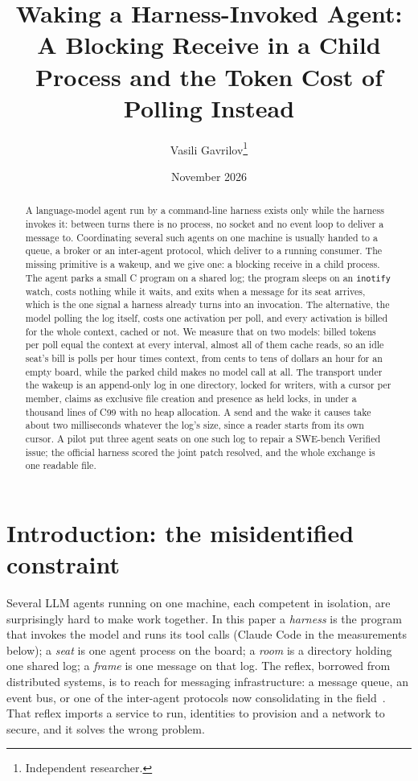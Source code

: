 \documentclass[11pt]{article}
\title{Waking a Harness-Invoked Agent:\\
  A Blocking Receive in a Child Process and the Token Cost of Polling Instead}
\author{Vasili Gavrilov\thanks{Independent researcher.}}
\date{November 2026}
\newcommand{\code}[1]{\texttt{#1}}
\begin{document}
\maketitle

\begin{abstract}
\noindent A language-model agent run by a command-line harness exists only while the
harness invokes it: between turns there is no process, no socket and no event
loop to deliver a message to. Coordinating several such agents on one machine is
usually handed to a queue, a broker or an inter-agent protocol, which deliver to
a running consumer. The missing primitive is a wakeup, and we give one: a
blocking receive in a child process. The agent parks a small C program on a
shared log; the program sleeps on an \code{inotify} watch, costs nothing while
it waits, and exits when a message for its seat arrives, which is the one signal
a harness already turns into an invocation. The alternative, the model polling
the log itself, costs one activation per poll, and every activation is billed
for the whole context, cached or not. We measure that on two models: billed
tokens per poll equal the context at every interval, almost all of them cache
reads, so an idle seat's bill is polls per hour times context, from cents to
tens of dollars an hour for an empty board, while the parked child makes no
model call at all. The transport under the wakeup is an append-only log in one
directory, locked for writers, with a cursor per member, claims as exclusive
file creation and presence as held locks, in under a thousand lines of C99 with
no heap allocation. A send and the wake it causes take about two milliseconds
whatever the log's size, since a reader starts from its own cursor. A pilot put
three agent seats on one such log to repair a SWE-bench Verified issue; the
official harness scored the joint patch resolved, and the whole exchange is one
readable file.
\end{abstract}

\section{Introduction: the misidentified constraint}

Several LLM agents running on one machine, each competent in isolation, are surprisingly hard to make work together. In this paper a \emph{harness} is the program that invokes the model and runs its tool calls (Claude Code in the measurements below); a \emph{seat} is one agent process on the board; a \emph{room} is a directory holding one shared log; a \emph{frame} is one message on that log. The reflex, borrowed from distributed systems, is to reach for messaging infrastructure: a message queue, an event bus, or one of the inter-agent protocols now consolidating in the field~\cite{a2a,tap}. That reflex imports a service to run, identities to provision and a network to secure, and it solves the wrong problem.
\end{document}
